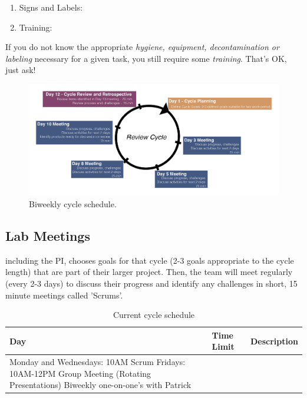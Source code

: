 \documentclass[10pt, letterpaper, twocolumn]{article} %
\begin{document}
\begin{enumerate}
	\item Signs and Labels:
	\item Training:
\end{enumerate}
If you do not know the appropriate {\it hygiene, equipment, decontamination or labeling} necessary for a given task, you still require some {\it training}. That’s OK, just ask!

\begin{figure}
  \includegraphics[width=\textwidth]{Core_Competencies-02.png}
  \caption{Biweekly cycle schedule.}
\end{figure}
\subsection{Lab Meetings}

including the PI, chooses goals for that cycle (2-3 goals appropriate to the cycle length) that are part of their larger project. Then, the team will meet regularly (every 2-3 days) to discuss their progress and identify any challenges in short, 15 minute meetings called 'Scrums'. 

\begin{table}
	\caption{Current cycle schedule}
	\centering
	\begin{tabular}{lll}
		\toprule
		\cmidrule(r){1-2}
		Day & Time Limit & Description \\
		\midrule
		Monday and Wednesdays: 10AM Scrum
  		Fridays: 10AM-12PM Group Meeting (Rotating Presentations)
    		Biweekly one-on-one's with Patrick
		\bottomrule
	\end{tabular}
\end{table}
\end{document}

